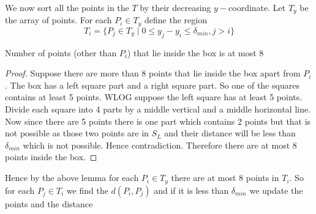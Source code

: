 We now sort all the points in the $T$ by their decreasing $y-$coordinate. Let $T_y$ be the array of points. For each $P_i\in T_y$ define the region $$T_i=\{P_j\in T_y \mid 0\leq y_j-y_i\leq \delta_{min}, j>i\}$$

\pagebreak
\begin{center}
	\begin{minipage}{0.7\textwidth}

		\begin{lemma}{}{}
			Number of points (other than $P_i$) that lie inside the box is at most 8
		\end{lemma}
		\begin{proof}
			Suppose there are more than 8 points that lie inside the box apart from $P_i$. The box has a left square part and a right square part. So one of the squares contains at least 5 points. WLOG suppose the left square has at least 5 points. Divide each square into 4 parts by a middle vertical and a middle horizontal line. Now since there are 5 points there is one part which contains 2 points but that is not possible as those two points are in $S_L$ and their distance will be less than $\delta_{min}$ which is not possible. Hence contradiction. Therefore there are at most 8 points inside the box.
		\end{proof}\parinn

		Hence by the above lemma for each $P_i\in T_y$ there are at most 8 points in $T_i$. So for each $P_j\in T_i$ we find the $d(P_i,P_j)$ and if it is less than $\delta_{min}$ we update the points and the distance
	\end{minipage}
	\hspace{1cm}
	\begin{minipage}{0.229\textwidth}




		\begin{tikzpicture}[x=0.75pt,y=0.75pt,yscale=-1,xscale=1]


\end{tikzpicture}
\end{minipage}
\end{center}
